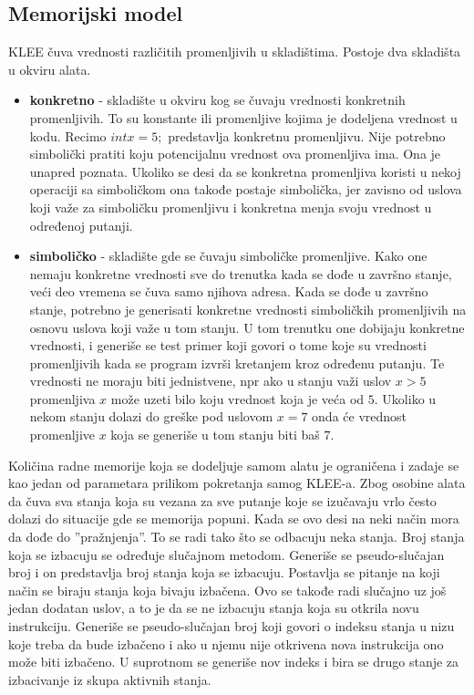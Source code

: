 \documentclass[12pt]{article}
\begin{document}
\subsection{Memorijski model}
KLEE čuva vrednosti različitih promenljivih u skladištima. Postoje dva skladišta u okviru alata. 
\begin{itemize}
    \item \textbf{konkretno} - skladište u okviru kog se čuvaju vrednosti konkretnih promenljivih. To su konstante ili promenljive kojima je dodeljena vrednost u kodu. Recimo $int x = 5;$ predstavlja konkretnu promenljivu. Nije potrebno simbolički pratiti koju potencijalnu vrednost ova promenljiva ima. Ona je unapred poznata. Ukoliko se desi da se konkretna promenljiva koristi u nekoj operaciji sa simboličkom ona takođe postaje simbolička, jer zavisno od uslova koji važe za simboličku promenljivu i konkretna menja svoju vrednost u određenoj putanji.
    
    \item \textbf{simboličko} - skladište gde se čuvaju simboličke promenljive. Kako one nemaju konkretne vrednosti sve do trenutka kada se dođe u završno stanje, veći deo vremena se čuva samo njihova adresa. Kada se dođe u završno stanje, potrebno je generisati konkretne vrednosti simboličkih promenljivih na osnovu uslova koji važe u tom stanju. U tom trenutku one dobijaju konkretne vrednosti, i generiše se test primer koji govori o tome koje su vrednosti promenljivih kada se program izvrši kretanjem kroz određenu putanju. Te vrednosti ne moraju biti jednistvene, npr ako u stanju važi uslov $x > 5$ promenljiva $x$ može uzeti bilo koju vrednost koja je veća od $5$. Ukoliko u nekom stanju dolazi do greške pod uslovom $x = 7$ onda će vrednost promenljive $x$ koja se generiše u tom stanju biti baš $7$.
\end{itemize}
\bigskip
Količina radne memorije koja se dodeljuje samom alatu je ograničena i zadaje se kao jedan od parametara prilikom pokretanja samog KLEE-a. Zbog osobine alata da čuva sva stanja koja su vezana za sve putanje koje se izučavaju vrlo često dolazi do situacije gde se memorija popuni. Kada se ovo desi na neki način mora da dođe do ''pražnjenja''. To se radi tako što se odbacuju neka stanja. Broj stanja koja se izbacuju se određuje slučajnom metodom. Generiše se pseudo-slučajan broj i on predstavlja broj stanja koja se izbacuju. Postavlja se pitanje na koji način se biraju stanja koja bivaju izbačena. Ovo se takođe radi slučajno uz još jedan dodatan uslov, a to je da se ne izbacuju stanja koja su otkrila novu instrukciju. Generiše se pseudo-slučajan broj koji govori o indeksu stanja u nizu koje treba da bude izbačeno i ako u njemu nije otkrivena nova instrukcija ono može biti izbačeno. U suprotnom se generiše nov indeks i bira se drugo stanje za izbacivanje iz skupa aktivnih stanja.
\newpage
\end{document}
